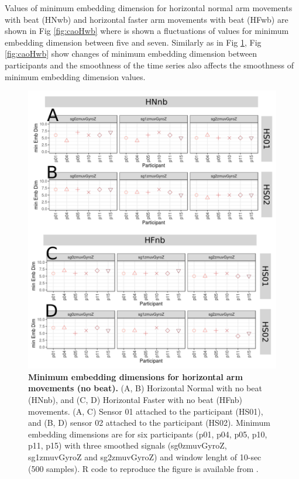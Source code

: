 Values of minimum embedding dimension for horizontal normal arm movements 
with beat (HNwb) and horizontal faster arm movements with beat (HFwb) 
are shown in Fig \ref{fig:caoHwb} where is shown a fluctuations of values
for minimum embedding dimension between five and seven.
Similarly as in Fig \ref{fig:caoHnb}, Fig \ref{fig:caoHwb} show changes of 
minimum embedding dimension between participants and the smoothness of the 
time series also affects the smoothness of minimum embedding dimension values.
\begin{figure}[!h]
\centering
\includegraphics[width=1.0\textwidth]{cao_Hnb_w10}
	\caption{
	{\bf Minimum embedding dimensions for horizontal arm movements 
	(no beat).} 
		(A, B) Horizontal Normal with no beat (HNnb), and 
		(C, D) Horizontal Faster with no beat (HFnb) movements.
		(A, C) Sensor 01 attached to the participant (HS01), and
		(B, D) sensor 02 attached to the participant (HS02).
		Minimum embedding dimensions are for six participants 
		(p01, p04, p05, p10, p11, p15) with three smoothed signals 
		(sg0zmuvGyroZ, sg1zmuvGyroZ and sg2zmuvGyroZ)
		and window lenght of 10-sec (500 samples).
		R code to reproduce the figure is available 
		from \cite{hwum2018}.
        }
    \label{fig:caoHnb}
\end{figure}
